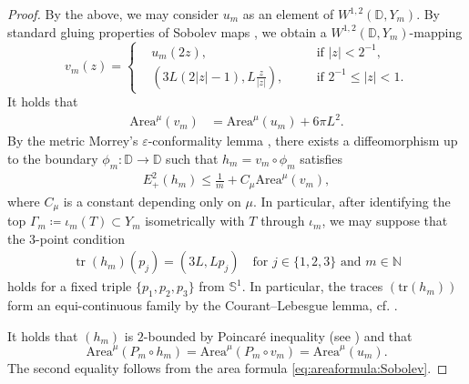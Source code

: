 \documentclass[a4paper,leqno]{amsart}
\numberwithin{equation}{section}
\theoremstyle{remark}
\theoremstyle{remark}
\newcommand{\N}{\mathbb{N}}
\DeclareMathOperator{\trace}{tr}
\begin{document}
\begin{proof}
By the above, we may consider $u_m$ as an element of $W^{1,2}( \mathbb{D}, Y_m )$. By standard gluing properties of Sobolev maps \cite[Section 2.2]{Lyt:Wen:16}, we obtain a $W^{1,2}( \mathbb{D}, Y_m )$-mapping
\begin{equation*}
    v_m(z)
    =
    \left\{
    \begin{split}
        &u_m(2z), \quad&&\text{if $|z| < 2^{-1},$}
        \\
        &\left( 3L( 2|z|-1 ), L \frac{z}{|z|} \right), \quad&&\text{if $2^{-1} \leq |z| < 1$.}
    \end{split}
    \right.
\end{equation*}
It holds that
\begin{align*}
    \mathrm{Area}^{\mu}( v_m )
    &=
    \mathrm{Area}^{\mu}( u_m )
    +
    6\pi  L^2.
\end{align*}
By the metric Morrey's $\varepsilon$-conformality lemma \cite{Fitz:Wen:20}, there exists a diffeomorphism up to the boundary $\phi_m \colon \mathbb{D} \rightarrow \mathbb{D}$ such that $h_m = v_m \circ \phi_m$ satisfies
\begin{align*}
    E_{+}^{2}( h_m )
    \leq
    \frac{ 1 }{ m }
    +
    C_\mu \mathrm{Area}^{\mu}( v_m ),
\end{align*}
where $C_\mu$ is a constant depending only on $\mu$. In particular, after identifying the top $\Gamma_m \coloneqq \iota_m( T ) \subset Y_m$ isometrically with $T$ through $\iota_m$, we may suppose that the 3-point condition 
\begin{align*}
    \trace(h_m)( p_j ) = ( 3L, Lp_j )
    \quad\text{for $j \in \{1,2,3\}$ and $m \in \N$}
\end{align*}
holds for a fixed triple $\{p_1, p_2, p_3\}$ from $\mathbb{S}^1$. In particular, the traces $( \mathrm{tr}(h_m) )$ form an equi-continuous family by the Courant--Lebesgue lemma, cf. \cite[Lemma 7.3]{Lyt:Wen:17:areamini}.

It holds that $( h_m )$ is $2$-bounded by Poincaré inequality (see \cite[Lemma 4.11]{Lyt:Wen:17:areamini}) and that
\begin{equation}\label{equation-area-bounds-after-projections}
    \mathrm{Area}^{\mu}( P_m \circ h_m )
    =
    \mathrm{Area}^{\mu}( P_m \circ v_m )
    =
    \mathrm{Area}^{\mu}( u_m ).
\end{equation}
The second equality follows from the area formula \eqref{eq:areaformula:Sobolev}.



\end{proof}
\end{document}

